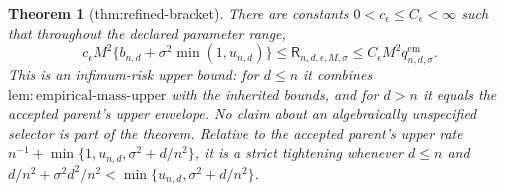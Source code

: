 \documentclass{article}
\newtheorem{theorem}{Theorem}
\begin{document}
\begin{theorem}[thm:refined-bracket]\label{thm:refined-bracket}
There are constants \(0<c_{\epsilon}\le C_{\epsilon}<\infty\) such that throughout the declared parameter range, \[c_{\epsilon}M^2\{b_{n,d}+\sigma^2\min(1,u_{n,d})\}\le\mathsf R_{n,d,\epsilon,M,\sigma}\le C_{\epsilon}M^2q_{n,d,\sigma}^{\mathrm{em}}.\] This is an infimum-risk upper bound: for \(d\le n\) it combines \(\mathrm{lem:empirical\text{-}mass\text{-}upper}\) with the inherited bounds, and for \(d>n\) it equals the accepted parent's upper envelope. No claim about an algebraically unspecified selector is part of the theorem. Relative to the accepted parent's upper rate \(n^{-1}+\min\{1,u_{n,d},\sigma^2+d/n^2\}\), it is a strict tightening whenever \(d\le n\) and \(d/n^2+\sigma^2d^2/n^2<\min\{u_{n,d},\sigma^2+d/n^2\}\).
\end{theorem}
\end{document}
